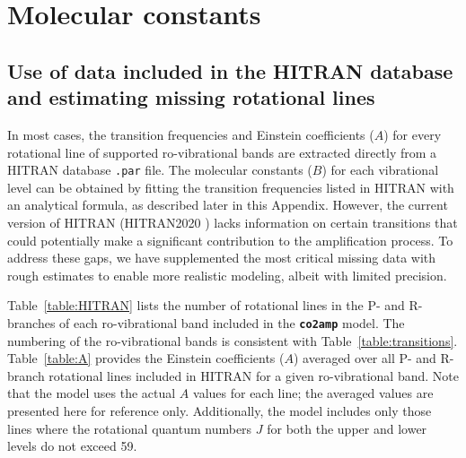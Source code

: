 \chapter{Molecular constants}
\label{appendix:molecular_constants}

\section*{Use of data included in the HITRAN database and estimating missing rotational lines}

In most cases, the transition frequencies and Einstein coefficients ($A$) for every rotational line of supported ro-vibrational bands are extracted directly from a HITRAN database \texttt{.par} file. The molecular constants ($B$) for each vibrational level can be obtained by fitting the transition frequencies listed in HITRAN with an analytical formula, as described later in this Appendix. However, the current version of HITRAN (HITRAN2020 \cite{Gordon-2022}) lacks information on certain transitions that could potentially make a significant contribution to the amplification process. To address these gaps, we have supplemented the most critical missing data with rough estimates to enable more realistic modeling, albeit with limited precision.

Table~\ref{table:HITRAN} lists the number of rotational lines in the P- and R-branches of each ro-vibrational band included in the \textbf{\texttt{co2amp}} model. The numbering of the ro-vibrational bands is consistent with Table~\ref{table:transitions}. Table~\ref{table:A} provides the Einstein coefficients ($A$) averaged over all P- and R-branch rotational lines included in HITRAN for a given ro-vibrational band. Note that the model uses the actual $A$ values for each line; the averaged values are presented here for reference only. Additionally, the model includes only those lines where the rotational quantum numbers $J$ for both the upper and lower levels do not exceed 59.


